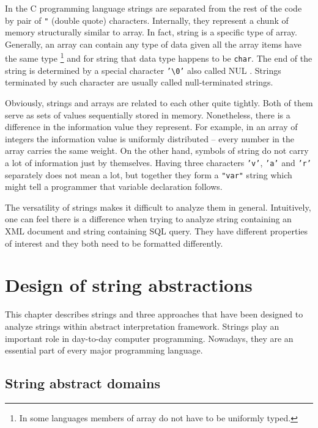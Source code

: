 \documentclass[12pt,final,oneside]{fithesis2}
\theoremstyle{definition}
\begin{document}
In the C programming language strings are separated from the rest of
the code by pair of \texttt{"} (double quote) characters. Internally,
they represent a chunk of memory structurally similar to array. In fact,
string is a specific type of array. Generally, an array can contain any
type of data given all the array items have the same type \footnote{In some
languages members of array do not have to be uniformly typed.} and for
string that data type happens to be \texttt{char}. The end of the string is
determined by a special character \texttt{'\textbackslash0'} also called
NUL \cite{ascii13-1}. Strings terminated by such character are usually
called null-terminated strings.

Obviously, strings and arrays are related to each other quite tightly.
Both of them serve as sets of values sequentially stored in memory.
Nonetheless, there is a difference in the information value they represent.
For example, in an array of integers the information value is uniformly
distributed -- every number in the array carries the same weight. On the
other hand, symbols of string do not carry a lot of information just by
themselves. Having three characters \texttt{'v'}, \texttt{'a'} and
\texttt{'r'} separately does not mean a lot, but together they form
a \texttt{"var"} string which might tell a programmer that variable
declaration follows.

The versatility of strings makes it difficult to analyze them in general.
Intuitively, one can feel there is a difference when trying to analyze
string containing an XML document and string containing SQL query. They
have different properties of interest and they both need to be formatted
differently.


\chapter{Design of string abstractions}
\label{chap:design}

This chapter describes strings and three approaches that have been designed
to analyze strings within abstract interpretation framework. Strings play
an important role in day-to-day computer programming. Nowadays, they are
an essential part of every major programming language.


\section{String abstract domains}
\label{sec:stringabstractdomains}
\end{document}
